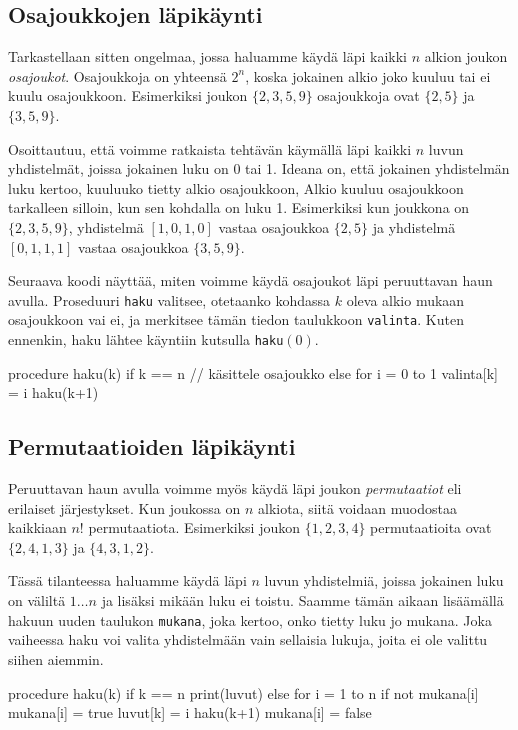 \subsection{Osajoukkojen läpikäynti}

Tarkastellaan sitten ongelmaa,
jossa haluamme käydä läpi kaikki $n$ alkion
joukon \emph{osajoukot}.
Osajoukkoja on yhteensä $2^n$,
koska jokainen alkio joko kuuluu tai ei kuulu osajoukkoon.
Esimerkiksi joukon $\{2,3,5,9\}$ osajoukkoja ovat
$\{2,5\}$ ja $\{3,5,9\}$.

Osoittautuu, että voimme ratkaista tehtävän
käymällä läpi kaikki $n$ luvun yhdistelmät,
joissa jokainen luku on 0 tai 1.
Ideana on, että jokainen yhdistelmän luku kertoo,
kuuluuko tietty alkio osajoukkoon,
Alkio kuuluu osajoukkoon tarkalleen silloin,
kun sen kohdalla on luku 1.
Esimerkiksi kun joukkona on $\{2,3,5,9\}$,
yhdistelmä $[1,0,1,0]$ vastaa
osajoukkoa $\{2,5\}$ ja
yhdistelmä $[0,1,1,1]$ vastaa osajoukkoa $\{3,5,9\}$.

Seuraava koodi näyttää, miten voimme käydä osajoukot
läpi peruuttavan haun avulla.
Proseduuri \texttt{haku} valitsee,
otetaanko kohdassa $k$ oleva alkio mukaan osajoukkoon vai ei,
ja merkitsee tämän tiedon taulukkoon \texttt{valinta}.
Kuten ennenkin, haku lähtee käyntiin kutsulla \texttt{haku}$(0)$.

\begin{code}
procedure haku(k)
    if k == n
        // käsittele osajoukko
    else
        for i = 0 to 1
            valinta[k] = i
            haku(k+1)
\end{code}

\subsection{Permutaatioiden läpikäynti}

Peruuttavan haun avulla voimme myös käydä läpi joukon
\emph{permutaatiot} eli erilaiset järjestykset.
Kun joukossa on $n$ alkiota, siitä voidaan muodostaa
kaikkiaan $n!$ permutaatiota.
Esimerkiksi joukon $\{1,2,3,4\}$ permutaatioita ovat
$\{2,4,1,3\}$ ja $\{4,3,1,2\}$.

Tässä tilanteessa haluamme käydä läpi $n$ luvun yhdistelmiä,
joissa jokainen luku on väliltä $1 \dots n$
ja lisäksi mikään luku ei toistu.
Saamme tämän aikaan lisäämällä hakuun uuden taulukon
\texttt{mukana}, joka kertoo, onko tietty luku jo mukana.
Joka vaiheessa haku voi valita yhdistelmään vain sellaisia lukuja,
joita ei ole valittu siihen aiemmin.

\begin{code}
procedure haku(k)
    if k == n
        print(luvut)
    else
        for i = 1 to n
            if not mukana[i]
                mukana[i] = true
                luvut[k] = i
                haku(k+1)
                mukana[i] = false
\end{code}

